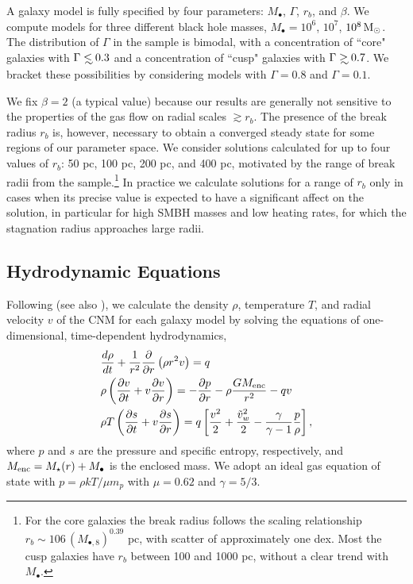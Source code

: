 \documentclass[usenatbib,fleqn]{mn2e}
\newcommand\lsim{\mathrel{\rlap{\lower4pt\hbox{\hskip1pt$\sim$}}
    \raise1pt\hbox{$<$}}}
\newcommand\gsim{\mathrel{\rlap{\lower4pt\hbox{\hskip1pt$\sim$}}
    \raise1pt\hbox{$>$}}}
\newcommand{\rb}{r_b}
\newcommand{\dxdy}[2]{\frac{d #1}{d #2} }
\newcommand{\drhodt}{\dxdy{\rho}{t}}
\newcommand{\ke}{\frac{v^2}{2}}
\newcommand{\kew}{\frac{\tilde{v}_{w}^2}{2}}
\newcommand{\gammaf}{\frac{\gamma}{\gamma-1}}
\newcommand{\cs}{\frac{p}{\rho}}
\newcommand{\Mbh}[1][]{M_{\bullet#1}}
\newcommand{\Mbheight}{M_{\bullet,8}}
\begin{document}
A galaxy model is fully specified by four parameters: $\Mbh$,
$\Gamma$, $r_b$, and $\beta$.  We compute models for three different
black hole masses, $\Mbh = 10^6$, $10^7$, $10^8 \,{\rm M_\odot}$.  The
distribution of $\Gamma$ in the \citet{LauerFaber+:2007a} sample is
bimodal, with a concentration of ``core" galaxies with $\Gamma \lsim
0.3$ and a concentration of ``cusp" galaxies with $\Gamma \gsim 0.7$.
We bracket these possibilities by considering models with $\Gamma=0.8$
and $\Gamma=0.1$.  

We fix $\beta = 2$ (a typical value) because our results are generally not sensitive to the
properties of the gas flow on radial scales $\gtrsim r_b$. The presence of the break radius $r_{b}$ is, however, necessary to obtain a converged steady state for some regions of our parameter space.  We consider solutions calculated for up to four values of $\rb$: 50 pc, 100 pc, 200 pc, and 400 pc, motivated by the range of break radii from the \citet{LauerFaber+:2007a} sample.\footnote{For the core galaxies the break radius follows the scaling relationship $\rb\sim 106 \, (\Mbheight)^{0.39}$ pc, with scatter of approximately one dex.  Most the cusp galaxies have
$\rb$ between 100 and 1000 pc, without a clear trend with $\Mbh$.}  In practice we calculate solutions for a range of $\rb$ only in cases when its precise value is expected to have a significant affect on the solution, in particular for high SMBH masses and low heating rates, for which the stagnation radius approaches large radii.   


\subsection{Hydrodynamic Equations}
\label{sec:hydro}

Following \citet{Quataert:2004a} (see also \citealt{HolzerAxford:1970a,De-ColleGuillochon+:2012a,ShcherbakovWong+:2014a}), we calculate the density $\rho$, temperature $T$, and radial velocity $v$ of the CNM for each galaxy model by solving the equations of one-dimensional, time-dependent hydrodynamics,
\begin{align}
  &\drhodt+\frac{1}{r^2}\frac{\partial}{\partial r}\left(\rho r^2 v\right)=q \label{eq:drhodt}\\
  &\rho \left(\frac{\partial v}{\partial t} + v\frac{\partial
      v}{\partial r}\right) =-\frac{\partial p}{\partial r}- \rho\frac{GM_{\rm enc}}{r^{2}} -q v \label{eq:dvdt}\\
  &\rho T\left(\frac{\partial s}{\partial t} + v\frac{\partial
      s}{\partial r}\right)=q\left[\ke+\kew-\gammaf \cs \right] 
, 
\label{eq:dsdt}
\end{align}
where $p$ and $s$ are the pressure and specific entropy, respectively, and $M_{\rm enc} = M_{\star}(r) + \Mbh$ is the
enclosed mass.  We adopt an ideal gas equation of state with $p = \rho kT/\mu m_p$ with $\mu = 0.62$  and $\gamma = 5/3$. 
\end{document}
